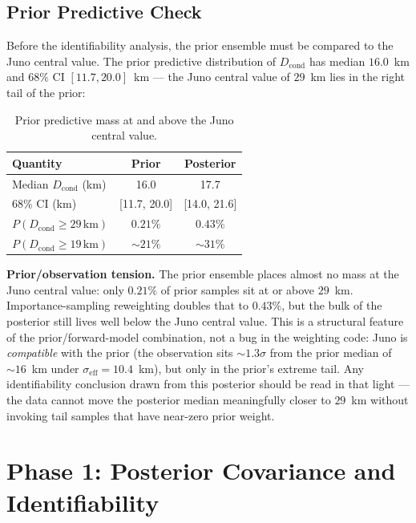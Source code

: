 \documentclass[11pt,a4paper]{article}
\begin{document}
\subsection{Prior Predictive Check}

Before the identifiability analysis, the prior ensemble must be compared to the
Juno central value.  The prior predictive distribution of $D_\mathrm{cond}$ has
median $16.0$~km and $68\%$ CI $[11.7, 20.0]$~km --- the Juno central value of
$29$~km lies in the right tail of the prior:

\begin{table}[H]
\centering
\caption{Prior predictive mass at and above the Juno central value.}
\label{tab:priortension}
\begin{tabular}{lcc}
\toprule
Quantity & Prior & Posterior \\
\midrule
Median $D_\mathrm{cond}$ (km) & 16.0 & 17.7 \\
68\% CI (km) & [11.7, 20.0] & [14.0, 21.6] \\
$P(D_\mathrm{cond} \geq 29\,\mathrm{km})$ & $0.21\%$ & $0.43\%$ \\
$P(D_\mathrm{cond} \geq 19\,\mathrm{km})$ & $\sim 21\%$ & $\sim 31\%$ \\
\bottomrule
\end{tabular}
\end{table}

\textbf{Prior/observation tension.} The prior ensemble places almost no mass at
the Juno central value: only $0.21\%$ of prior samples sit at or above $29$~km.
Importance-sampling reweighting doubles that to $0.43\%$, but the bulk of the
posterior still lives well below the Juno central value.  This is a structural
feature of the prior/forward-model combination, not a bug in the weighting code:
Juno is \emph{compatible} with the prior (the observation sits $\sim 1.3\sigma$
from the prior median of $\sim 16$~km under $\sigma_\mathrm{eff} = 10.4$~km),
but only in the prior's extreme tail.  Any identifiability conclusion drawn
from this posterior should be read in that light --- the data cannot move the
posterior median meaningfully closer to $29$~km without invoking tail samples
that have near-zero prior weight.

\section{Phase 1: Posterior Covariance and Identifiability}
\end{document}
